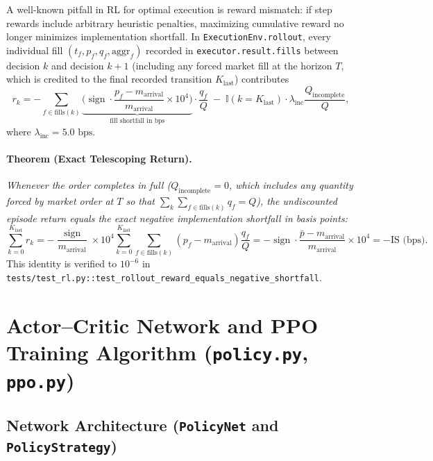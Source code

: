 \documentclass[11pt,a4paper]{article}
\newcommand{\code}[1]{\texttt{#1}}
\newcommand{\sign}{\operatorname{sign}}
\begin{document}
A well-known pitfall in RL for optimal execution is reward mismatch: if step rewards include arbitrary
heuristic penalties, maximizing cumulative reward no longer minimizes implementation shortfall. In
\code{ExecutionEnv.rollout}, every individual fill $(t_f, p_f, q_f, \text{aggr}_f)$ recorded in
\code{executor.result.fills} between decision $k$ and decision $k+1$ (including any forced market fill at
the horizon $T$, which is credited to the final recorded transition $K_{\text{last}}$) contributes
\begin{equation}
  \label{eq:step_reward}
  r_k = -\sum_{f \in \text{fills}(k)}
  \underbrace{\Big(\sign \cdot \frac{p_f - m_{\text{arrival}}}{m_{\text{arrival}}} \times 10^4\Big)}_{\text{fill shortfall in bps}}
  \cdot \frac{q_f}{Q}
  \;-\; \mathbb{I}(k = K_{\text{last}})\cdot \lambda_{\text{inc}} \frac{Q_{\text{incomplete}}}{Q},
\end{equation}
where $\lambda_{\text{inc}} = 5.0\text{ bps}$.

\paragraph{Theorem (Exact Telescoping Return).} \emph{Whenever the order completes in full
($Q_{\text{incomplete}} = 0$, which includes any quantity forced by market order at $T$ so that
$\sum_{k} \sum_{f \in \text{fills}(k)} q_f = Q$), the undiscounted episode return equals the exact
negative implementation shortfall in basis points:}
\begin{equation}
  \sum_{k=0}^{K_{\text{last}}} r_k
  = -\frac{\sign}{m_{\text{arrival}}} \times 10^4 \sum_{k=0}^{K_{\text{last}}} \sum_{f \in \text{fills}(k)}
    (p_f - m_{\text{arrival}})\frac{q_f}{Q}
  = -\sign\cdot\frac{\bar p - m_{\text{arrival}}}{m_{\text{arrival}}} \times 10^4
  = -\text{IS (bps)}.
\end{equation}
This identity is verified to $10^{-6}$ in \code{tests/test\_rl.py::test\_rollout\_reward\_equals\_negative\_shortfall}.

\section{Actor--Critic Network and PPO Training Algorithm (\code{policy.py}, \code{ppo.py})}
\label{sec:ppo}

\subsection{Network Architecture (\code{PolicyNet} and \code{PolicyStrategy})}
\end{document}
